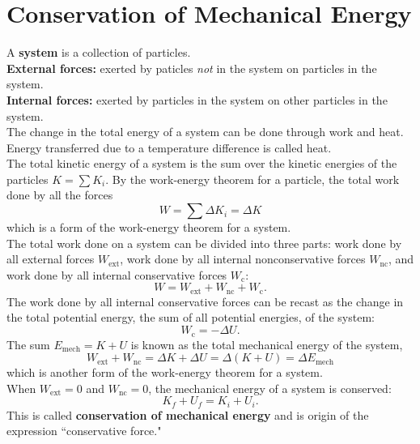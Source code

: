 \documentclass[11pt,a4paper]{report}
\begin{document}
\section{Conservation of Mechanical Energy}
A \textbf{system} is a collection of particles.
\\\textbf{External forces:} exerted by paticles \textit{not} in the system on particles in the system.
\\\textbf{Internal forces:} exerted by particles in the system on other particles in the system.
\\The change in the total energy of a system can be done through work and heat. Energy transferred due to a temperature difference is called heat.
\\The total kinetic energy of a system is the sum over the kinetic energies of the particles $K = \sum{K_i}$. By the work-energy theorem for a particle, the total work done by all the forces $$W = \sum{\Delta{K_i}} = \Delta{K}$$ which is a form of the work-energy theorem for a system.
\\The total work done on a system can be divided into three parts: work done by all external forces $W_\mathrm{ext}$, work done by all internal nonconservative forces $W_\mathrm{nc}$, and work done by all internal conservative forces $W_\mathrm{c}$: $$W = W_\mathrm{ext} + W_\mathrm{nc} + W_\mathrm{c}.$$
The work done by all internal conservative forces can be recast as the change in the total potential energy, the sum of all potential energies, of the system: $$W_\mathrm{c} = -\Delta{U}.$$
The sum $E_\mathrm{mech} = K + U$ is known as the total mechanical energy of the system, $$W_\mathrm{ext} + W_\mathrm{nc} = \Delta{K} + \Delta{U} = \Delta{\left(K + U\right)} = \Delta{E_\mathrm{mech}}$$ which is another form of the work-energy theorem for a system.
\\When $W_\mathrm{ext} = 0$ and $W_\mathrm{nc} = 0$, the mechanical energy of a system is conserved: $$K_f + U_f = K_i + U_i.$$ This is called \textbf{conservation of mechanical energy} and is origin of the expression ``conservative force."
\end{document}
